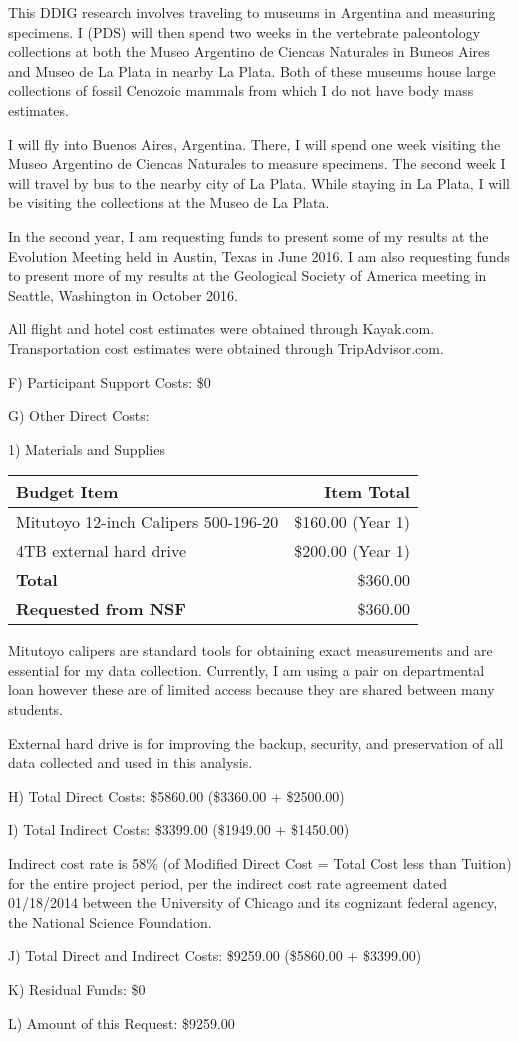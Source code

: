 \documentclass[11pt,letterpaper]{article}
\begin{document}
This DDIG research involves traveling to museums in Argentina and measuring specimens. I (PDS) will then spend two weeks in the vertebrate paleontology collections at both the Museo Argentino de Ciencas Naturales in Buneos Aires and Museo de La Plata in nearby La Plata. Both of these museums house large collections of fossil Cenozoic mammals from which I do not have body mass estimates.

I will fly into Buenos Aires, Argentina. There, I will spend one week visiting the Museo Argentino de Ciencas Naturales to measure specimens. The second week I will travel by bus to the nearby city of La Plata. While staying in La Plata, I will be visiting the collections at the Museo de La Plata. 

In the second year, I am requesting funds to present some of my results at the Evolution Meeting held in Austin, Texas in June 2016. I am also requesting funds to present more of my results at the Geological Society of America meeting in Seattle, Washington in October 2016.

All flight and hotel cost estimates were obtained through Kayak.com. Transportation cost estimates were obtained through TripAdvisor.com.


F) Participant Support Costs: \$0

G) Other Direct Costs:

1) Materials and Supplies

\begin{tabular}[H]{l r}
  Budget Item & Item Total \\
  \hline
  Mitutoyo 12-inch Calipers 500-196-20 & \$160.00 (Year 1) \\
  4TB external hard drive & \$200.00 (Year 1) \\
  \textbf{Total} & \$360.00 \\
  \textbf{Requested from NSF} & \$360.00
\end{tabular}

Mitutoyo calipers are standard tools for obtaining exact measurements and are essential for my data collection. Currently, I am using a pair on departmental loan however these are of limited access because they are shared between many students. 

External hard drive is for improving the backup, security, and preservation of all data collected and used in this analysis.

H) Total Direct Costs: \$5860.00 (\$3360.00 + \$2500.00)

I) Total Indirect Costs: \$3399.00 (\$1949.00 + \$1450.00)

Indirect cost rate is 58\% (of Modified Direct Cost = Total Cost less than Tuition) for the entire project period, per the indirect cost rate agreement dated 01/18/2014 between the University of Chicago and its cognizant federal agency, the National Science Foundation.


J) Total Direct and Indirect Costs: \$9259.00 (\$5860.00 + \$3399.00)

K) Residual Funds: \$0

L) Amount of this Request: \$9259.00
\end{document}
